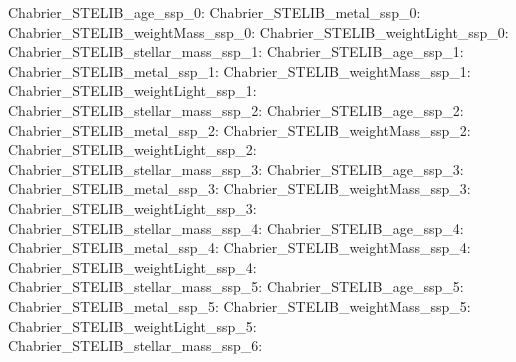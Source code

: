 Chabrier\_STELIB\_age\_ssp\_0:  \newline 
Chabrier\_STELIB\_metal\_ssp\_0:  \newline 
Chabrier\_STELIB\_weightMass\_ssp\_0:  \newline 
Chabrier\_STELIB\_weightLight\_ssp\_0:  \newline 
Chabrier\_STELIB\_stellar\_mass\_ssp\_1:  \newline 
Chabrier\_STELIB\_age\_ssp\_1:  \newline 
Chabrier\_STELIB\_metal\_ssp\_1:  \newline 
Chabrier\_STELIB\_weightMass\_ssp\_1:  \newline 
Chabrier\_STELIB\_weightLight\_ssp\_1:  \newline 
Chabrier\_STELIB\_stellar\_mass\_ssp\_2:  \newline 
Chabrier\_STELIB\_age\_ssp\_2:  \newline 
Chabrier\_STELIB\_metal\_ssp\_2:  \newline 
Chabrier\_STELIB\_weightMass\_ssp\_2:  \newline 
Chabrier\_STELIB\_weightLight\_ssp\_2:  \newline 
Chabrier\_STELIB\_stellar\_mass\_ssp\_3:  \newline 
Chabrier\_STELIB\_age\_ssp\_3:  \newline 
Chabrier\_STELIB\_metal\_ssp\_3:  \newline 
Chabrier\_STELIB\_weightMass\_ssp\_3:  \newline 
Chabrier\_STELIB\_weightLight\_ssp\_3:  \newline 
Chabrier\_STELIB\_stellar\_mass\_ssp\_4:  \newline 
Chabrier\_STELIB\_age\_ssp\_4:  \newline 
Chabrier\_STELIB\_metal\_ssp\_4:  \newline 
Chabrier\_STELIB\_weightMass\_ssp\_4:  \newline 
Chabrier\_STELIB\_weightLight\_ssp\_4:  \newline 
Chabrier\_STELIB\_stellar\_mass\_ssp\_5:  \newline 
Chabrier\_STELIB\_age\_ssp\_5:  \newline 
Chabrier\_STELIB\_metal\_ssp\_5:  \newline 
Chabrier\_STELIB\_weightMass\_ssp\_5:  \newline 
Chabrier\_STELIB\_weightLight\_ssp\_5:  \newline 
Chabrier\_STELIB\_stellar\_mass\_ssp\_6:  \newline 
